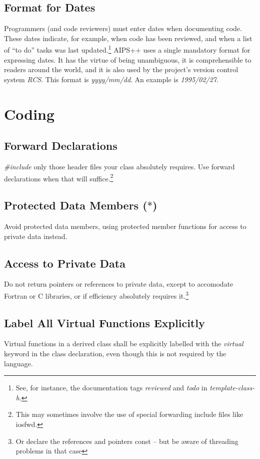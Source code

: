 \subsection {Format for Dates}
Programmers (and code reviewers) must enter dates when documenting code.
These dates indicate, for example, when code has been reviewed, and when a list 
of ``to do'' tasks was last updated.\footnote{See, for instance, the 
documentation tags {\em reviewed} and {\em todo} in {\em template-class-h}.}
AIPS++ uses a single mandatory format for expressing dates.  It has the virtue
of being unambiguous, it is comprehensible to readers around the world, and
it is also used by the project's version control system {\em RCS}.  This 
format is {\em yyyy/mm/dd}. An example is {\em 1995/02/27}.
\section {Coding}
\subsection {Forward Declarations}
{\em \#include} only those header files your class absolutely requires.  Use
\bmar forward declarations when that will suffice.\footnote {This may sometimes
involve the use of special forwarding include files like iosfwd.}
\subsection {Protected Data Members ($\ast$)}
Avoid protected data members, using protected member functions for access
to private data instead.
\subsection {Access to Private Data}
Do not return pointers or references to private data, except to accomodate
Fortran or C libraries, or if efficiency absolutely requires it.\footnote {Or
declare the references and pointers const -- but be aware of threading
problems in that case}
\subsection {Label All Virtual Functions Explicitly}
Virtual functions in a derived class shall be explicitly labelled with
the {\em virtual} keyword in the class declaration, even though this is
 not required by the language.

